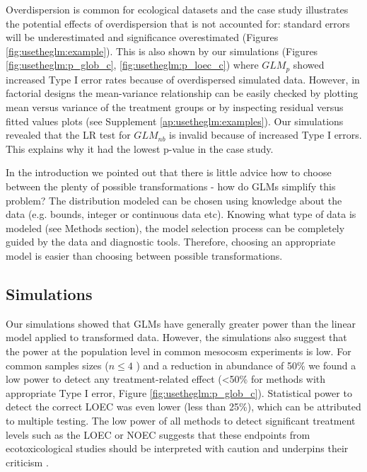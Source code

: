 Overdispersion is common for ecological datasets \citep{warton_many_2005} and the case study illustrates the potential effects of overdispersion that is not accounted for: standard errors will be underestimated and significance overestimated (Figures \ref{fig:usetheglm:example}).
This is also shown by our simulations (Figures \ref{fig:usetheglm:p_glob_c}, \ref{fig:usetheglm:p_loec_c}) where $GLM_p$ showed increased Type I error rates because of overdispersed simulated data. 
However, in factorial designs the mean-variance relationship can be easily \newline 
checked by plotting mean versus variance of the treatment groups or by inspecting residual versus fitted values plots (see Supplement \ref{ap:usetheglm:examples}).
Our simulations revealed that the LR test for $GLM_{nb}$ is invalid because of increased Type I errors. This explains why it had the lowest p-value in the case study.

In the introduction we pointed out that there is little advice how to choose between the plenty of possible transformations - how do GLMs simplify this problem?
The distribution modeled can be chosen using knowledge about the data (e.g. bounds, integer or continuous data etc).
Knowing what type of data is modeled (see Methods section), the model selection process can be completely guided by the data and diagnostic tools. Therefore, choosing an appropriate model is easier than choosing between possible transformations.


\subsection{Simulations}
\label{ssec:usetheglm:discsim}
Our simulations showed that GLMs have generally greater power than the linear model applied to transformed data.
However, the simulations also suggest that the power at the population level in common mesocosm experiments is low.
For common samples sizes ($n \le 4$ ) and a reduction in abundance of 50\% we found a low power to detect any treatment-related effect (\textless 50\% for methods with appropriate Type I error, Figure \ref{fig:usetheglm:p_glob_c}).
Statistical power to detect the correct LOEC was even lower (less than 25\%), which can be attributed to multiple testing.
The low power of all methods to detect significant treatment levels such as the LOEC or NOEC suggests that these endpoints from ecotoxicological studies should be interpreted with caution and underpins their criticism \citep{laskowski_good_1995,landis_well_2011}.

